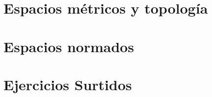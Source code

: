 \documentclass[11pt, a4paper, oneside]{book}
\theoremstyle{plain}
\theoremstyle{definition}
\theoremstyle{remark}
\begin{document}






\part{Espacios métricos y topología}















\part{Espacios normados}





\part{Ejercicios Surtidos}


\end{document}
